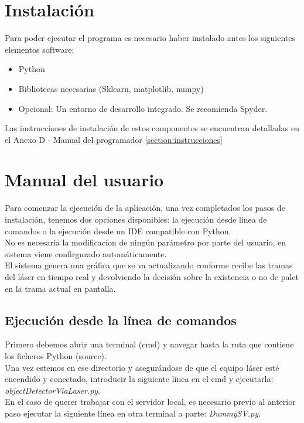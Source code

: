 \section{Instalación}\label{instalacion}
Para poder ejecutar el programa es necesario haber instalado antes los siguientes elementos software:\\
\begin{itemize}
\tightlist
\item Python
\item Bibliotecas necesarias (Sklearn, matplotlib, numpy)
\item Opcional: Un entorno de desarrollo integrado. Se recomienda Spyder.
\end{itemize}

Las instrucciones de instalación de estos componentes se encuentran detalladas en el Anexo D - Manual del programador \ref{section:instrucciones}

\section{Manual del usuario}

Para comenzar la ejecución de la aplicación, una vez completados los pasos de instalación, tenemos dos opciones disponibles: la ejecución desde línea de comandos o la ejecución desde un IDE compatible con Python. \\
No es necesaria la modificacíon de ningún parámetro por parte del usuario, en sistema viene confirgurado automáticamente. \\
El sistema genera una gráfica que se va actualizando conforme recibe las tramas del láser en tiempo real y devolviendo la decisión sobre la existencia o no de palet en la trama actual en pantalla.

\subsection{Ejecución desde la línea de comandos}
Primero debemos abrir una terminal (cmd) y navegar hasta la ruta que contiene los ficheros Python (source).\\
Una vez estemos en ese directorio y asegurándose de que el equipo láser esté encendido y conectado, introducir la siguiente línea en el cmd y ejecutarla: \textit{objectDetectorViaLaser.py}.\\
En el caso de querer trabajar con el servidor local, es necesario previo al anterior paso ejecutar la siguiente línea en otra terminal a parte: \textit{DummySV.py}.

